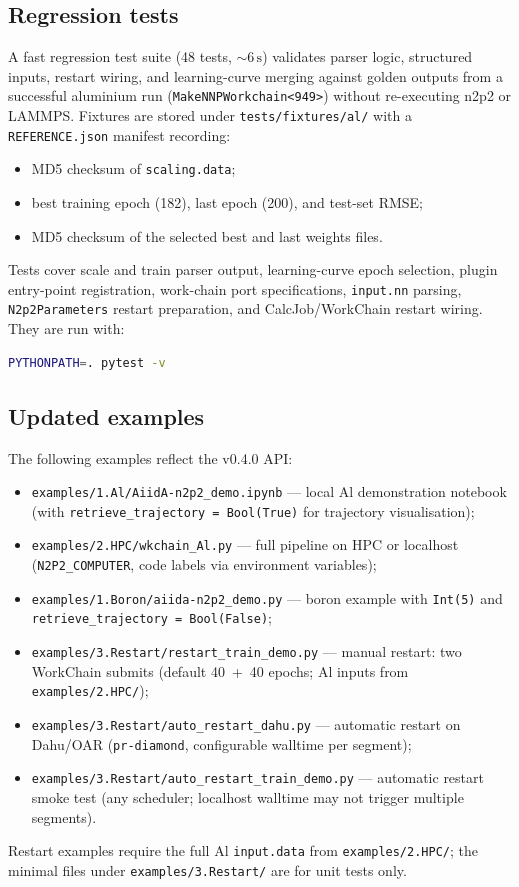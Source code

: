 \subsection{Regression tests}

A fast regression test suite (48 tests, ${\sim}6\,\mathrm{s}$) validates parser
logic, structured inputs, restart wiring, and learning-curve merging against golden
outputs from a successful aluminium run
(\texttt{MakeNNPWorkchain<949>}) without re-executing n2p2 or LAMMPS.
Fixtures are stored under \texttt{tests/fixtures/al/} with a
\texttt{REFERENCE.json} manifest recording:
\begin{itemize}
  \item MD5 checksum of \texttt{scaling.data};
  \item best training epoch (182), last epoch (200), and test-set RMSE;
  \item MD5 checksum of the selected best and last weights files.
\end{itemize}

Tests cover scale and train parser output, learning-curve epoch selection, plugin
entry-point registration, work-chain port specifications, \texttt{input.nn} parsing,
\texttt{N2p2Parameters} restart preparation, and CalcJob/WorkChain restart wiring.
They are run with:
\begin{lstlisting}[language=bash]
PYTHONPATH=. pytest -v
\end{lstlisting}

\subsection{Updated examples}

The following examples reflect the v0.4.0 API:
\begin{itemize}
  \item \texttt{examples/1.Al/AiidA-n2p2\_demo.ipynb} --- local Al demonstration
        notebook (with \texttt{retrieve\_trajectory = Bool(True)} for trajectory
        visualisation);
  \item \texttt{examples/2.HPC/wkchain\_Al.py} --- full pipeline on HPC or
        localhost (\texttt{N2P2\_COMPUTER}, code labels via environment variables);
  \item \texttt{examples/1.Boron/aiida-n2p2\_demo.py} --- boron example with
        \texttt{Int(5)} and \texttt{retrieve\_trajectory = Bool(False)};
  \item \texttt{examples/3.Restart/restart\_train\_demo.py} --- manual restart:
        two WorkChain submits (default 40~+~40 epochs; Al inputs from
        \texttt{examples/2.HPC/});
  \item \texttt{examples/3.Restart/auto\_restart\_dahu.py} --- automatic restart
        on Dahu/OAR (\texttt{pr-diamond}, configurable walltime per segment);
  \item \texttt{examples/3.Restart/auto\_restart\_train\_demo.py} --- automatic
        restart smoke test (any scheduler; localhost walltime may not trigger
        multiple segments).
\end{itemize}

Restart examples require the full Al \texttt{input.data} from
\texttt{examples/2.HPC/}; the minimal files under \texttt{examples/3.Restart/} are
for unit tests only.
